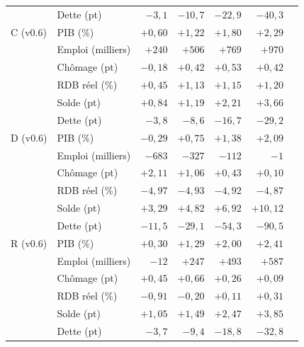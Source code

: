 \begin{longtable}{llrrrrr}
 & Dette (pt) & $-3{,}1$ & $-10{,}7$ & $-22{,}9$ & $-40{,}3$ & \\
\addlinespace
C (v0.6) & PIB (\%) & $+0{,}60$ & $+1{,}22$ & $+1{,}80$ & $+2{,}29$ & \\
 & Emploi (milliers) & $+240$ & $+506$ & $+769$ & $+970$ & \\
 & Chômage (pt) & $-0{,}18$ & $+0{,}42$ & $+0{,}53$ & $+0{,}42$ & \\
 & RDB réel (\%) & $+0{,}45$ & $+1{,}13$ & $+1{,}15$ & $+1{,}20$ & \\
 & Solde (pt) & $+0{,}84$ & $+1{,}19$ & $+2{,}21$ & $+3{,}66$ & \\
 & Dette (pt) & $-3{,}8$ & $-8{,}6$ & $-16{,}7$ & $-29{,}2$ & \\
\addlinespace
D (v0.6) & PIB (\%) & $-0{,}29$ & $+0{,}75$ & $+1{,}38$ & $+2{,}09$ & \\
 & Emploi (milliers) & $-683$ & $-327$ & $-112$ & $-1$ & \\
 & Chômage (pt) & $+2{,}11$ & $+1{,}06$ & $+0{,}43$ & $+0{,}10$ & \\
 & RDB réel (\%) & $-4{,}97$ & $-4{,}93$ & $-4{,}92$ & $-4{,}87$ & \\
 & Solde (pt) & $+3{,}29$ & $+4{,}82$ & $+6{,}92$ & $+10{,}12$ & \\
 & Dette (pt) & $-11{,}5$ & $-29{,}1$ & $-54{,}3$ & $-90{,}5$ & \\
\addlinespace
R (v0.6) & PIB (\%) & $+0{,}30$ & $+1{,}29$ & $+2{,}00$ & $+2{,}41$ & \\
 & Emploi (milliers) & $-12$ & $+247$ & $+493$ & $+587$ & \\
 & Chômage (pt) & $+0{,}45$ & $+0{,}66$ & $+0{,}26$ & $+0{,}09$ & \\
 & RDB réel (\%) & $-0{,}91$ & $-0{,}20$ & $+0{,}11$ & $+0{,}31$ & \\
 & Solde (pt) & $+1{,}05$ & $+1{,}49$ & $+2{,}47$ & $+3{,}85$ & \\
 & Dette (pt) & $-3{,}7$ & $-9{,}4$ & $-18{,}8$ & $-32{,}8$ & \\\bottomrule\end{longtable}
